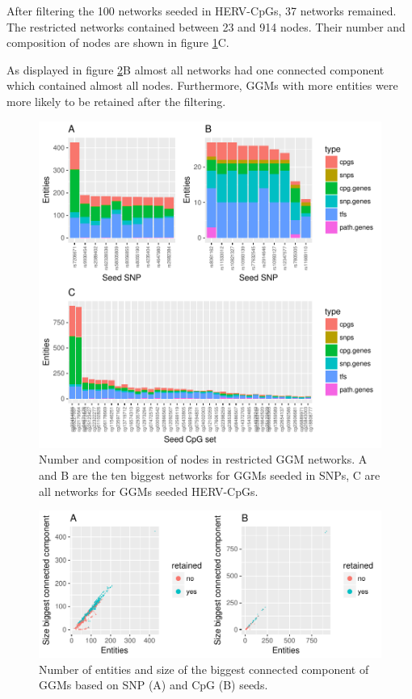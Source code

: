 \documentclass[a4paper,12pt,twoside,openright]{report}
\begin{document}
After filtering the 100 networks seeded in HERV-CpGs, 37 networks remained. The restricted networks contained between 23 and 914 nodes. Their number and composition of nodes are shown in figure \ref{fig:ggm.cc.nodes.bar}C. 

As displayed in figure \ref{fig:ggm.entity.cc.scatter}B almost all networks had one connected component which contained almost all nodes. Furthermore, GGMs with more entities were more likely to be retained after the filtering. 

\begin{figure}[tb]
	\includegraphics[scale = 1, keepaspectratio = true]{../figures/hervS2_ggm_cc_nodes_bar}  
	\caption{Number and composition of nodes in restricted GGM networks. A and B are the ten biggest networks for GGMs seeded in SNPs, C are all networks for GGMs seeded HERV-CpGs.}
    \label{fig:ggm.cc.nodes.bar}
\end{figure}

\begin{figure}[tb]
	\includegraphics[scale = 1, keepaspectratio = true]{../figures/hervS2_ggm_entity_cc_size_scatter}  
	\caption{Number of entities and size of the biggest connected component of GGMs based on SNP (A) and CpG (B) seeds.}
    \label{fig:ggm.entity.cc.scatter}
\end{figure}
\end{document}
